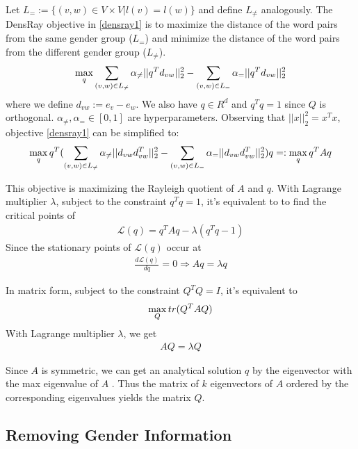 Let $L_{=}:=\{(v,w)\in V\times V|l(v)=l(w)\}$ and define
$L_{\neq}$ analogously.  The DensRay objective
in \eqref{densray1} is to maximize the distance of the word
pairs from the same gender group ($L_{=}$) and minimize the
distance of the word pairs from the different gender group
($L_{\neq}$).
\begin{eqnarray}
\max\limits_{q} 
\sum_{(v,w)\in L_{\neq}}\alpha_{\neq}||q^Td_{vw}||^2_2
-\sum_{(v,w)\in L_{=}}\alpha_{=}||q^Td_{vw}||^2_2
\eqlabel{densray1}
\end{eqnarray}
where we define $d_{vw}:=e_v-e_w$. We also have $q\in R^d$
and $q^Tq=1$ since $Q$ is orthogonal. $\alpha_{\neq},\alpha_{=}\in [0,1]$ are hyperparameters. Observing that $||x||^2_2=x^Tx$, objective \eqref{densray1} can be simplified to:
\begin{eqnarray}
\max \limits_{q} q^T(
\sum_{(v,w)\in L_{\neq}}\alpha_{\neq}||d_{vw}d_{vw}^T||^2_2-\sum_{(v,w)\in L_{=}}\alpha_{=}||d_{vw}d_{vw}^T||^2_2)q=:\max\limits_{q} q^TAq
\eqlabel{eq:densray2}
\end{eqnarray}

This objective is maximizing the Rayleigh quotient of $A$ and $q$. With Lagrange multiplier $\lambda$, subject to the constraint $q^{T}q=1$, it's equivalent to to find the critical points of
\begin{eqnarray}
\mathcal{L}(q)=q^{T}Aq-\lambda(q^{T}q-1)
\end{eqnarray}
Since the stationary points of $\mathcal{L}(q)$ occur at
\begin{eqnarray}
\frac{d\mathcal{L}(q)}{dq}=0 \Rightarrow Aq=\lambda q
\end{eqnarray}


In matrix form, subject to the constraint $Q^{T}Q=I$, it's equivalent to  
\begin{eqnarray}
\max\limits_{Q} \space tr(Q^{T}AQ)
\end{eqnarray}
With Lagrange multiplier $\lambda$, we get 
\begin{eqnarray}
AQ=\lambda Q
\end{eqnarray}

Since $A$ is symmetric, we can get an analytical solution $q$ by the eigenvector with the max eigenvalue of $A$ \cite{horn1990matrix}. 
Thus the matrix of $k$ eigenvectors of $A$ ordered by the corresponding eigenvalues yields the matrix $Q$.
\subsection{Removing Gender Information}

